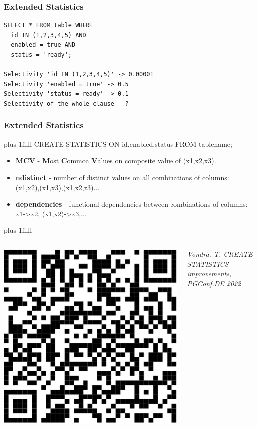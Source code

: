 \documentclass{beamer}
\begin{document}
\begin{frame}[fragile]\frametitle{Extended Statistics}
\begin{lstlisting}
SELECT * FROM table WHERE
  id IN (1,2,3,4,5) AND
  enabled = true AND
  status = 'ready';

Selectivity 'id IN (1,2,3,4,5)' -> 0.00001
Selectivity 'enabled = true' -> 0.5
Selectivity 'status = ready' -> 0.1
Selectivity of the whole clause - ?
\end{lstlisting}
\end{frame}

\begin{frame}[fragile]\frametitle{Extended Statistics}
\vskip0pt plus 1filll
CREATE STATISTICS ON id,enabled,status FROM tablename;
\vspace{10pt}
\begin{itemize}
  \item \textbf{MCV} - \textbf{M}ost \textbf{C}ommon \textbf{V}alues on composite value  of (x1,x2,x3).
  \item \textbf{ndistinct} - number of distinct values on all combinations of columns: (x1,x2),(x1,x3),(x1,x2,x3)...
  \item \textbf{dependencies} - functional dependencies between combinations of columns: x1->x2, (x1,x2)->x3,...
\end{itemize}
\vskip0pt plus 1filll
\begin{columns}\begin{column}{0.03\textwidth}
\includegraphics[scale=0.1]{pics/vondra_extstat}
\end{column}\begin{column}{0.8\textwidth}
\textit{Vondra. T. CREATE STATISTICS improvements,\\ PGConf.DE 2022}
\end{column}\end{columns}
\end{frame}
\end{document}
